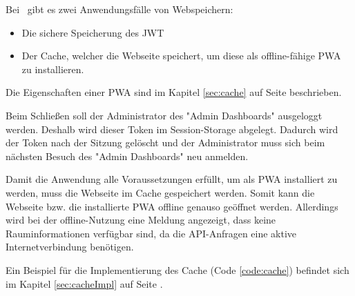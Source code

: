 
Bei \ZELIA\ gibt es zwei Anwendungsfälle von Webspeichern:

\begin{itemize}
    \item Die sichere Speicherung des JWT
    \item Der Cache, welcher die Webseite speichert, um diese als offline-fähige PWA zu installieren.
\end{itemize}

Die Eigenschaften einer PWA sind im Kapitel \ref{sec:cache} auf Seite \pageref{sec:cache} beschrieben.


Beim Schließen soll der Administrator des "Admin Dashboards" ausgeloggt werden. 
Deshalb wird dieser Token im Session-Storage abgelegt. 
Dadurch wird der Token nach der Sitzung gelöscht und der Administrator muss sich beim nächsten Besuch des "Admin Dashboards" neu anmelden.


Damit die Anwendung alle Voraussetzungen erfüllt, um als PWA installiert zu werden, muss die Webseite im Cache gespeichert werden. 
Somit kann die Webseite bzw. die installierte PWA offline genauso geöffnet werden. 
Allerdings wird bei der offline-Nutzung eine Meldung angezeigt, dass keine Rauminformationen verfügbar sind, da die API-Anfragen eine aktive Internetverbindung benötigen.

Ein Beispiel für die Implementierung des Cache (Code \ref{code:cache}) befindet sich im Kapitel \ref{sec:cacheImpl} auf Seite \pageref{code:cache}.
 
